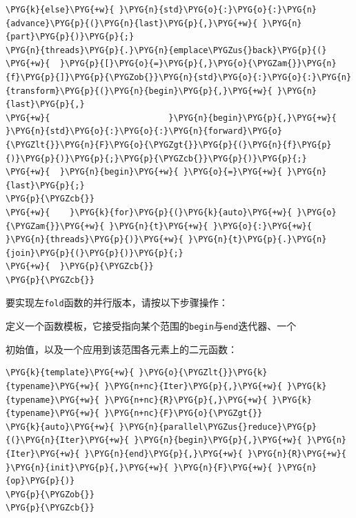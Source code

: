 \begin{codeblockbg}
\begin{Verbatim}[commandchars=\\\{\},breaklines=true,breakanywhere=true,fontsize=\codefont,xleftmargin=17bp]
\PYG{k}{else}\PYG{+w}{ }\PYG{n}{std}\PYG{o}{:}\PYG{o}{:}\PYG{n}{advance}\PYG{p}{(}\PYG{n}{last}\PYG{p}{,}\PYG{+w}{ }\PYG{n}{part}\PYG{p}{)}\PYG{p}{;}
\PYG{n}{threads}\PYG{p}{.}\PYG{n}{emplace\PYGZus{}back}\PYG{p}{(}
\PYG{+w}{  }\PYG{p}{[}\PYG{o}{=}\PYG{p}{,}\PYG{o}{\PYGZam{}}\PYG{n}{f}\PYG{p}{]}\PYG{p}{\PYGZob{}}\PYG{n}{std}\PYG{o}{:}\PYG{o}{:}\PYG{n}{transform}\PYG{p}{(}\PYG{n}{begin}\PYG{p}{,}\PYG{+w}{ }\PYG{n}{last}\PYG{p}{,}
\PYG{+w}{                        }\PYG{n}{begin}\PYG{p}{,}\PYG{+w}{ }\PYG{n}{std}\PYG{o}{:}\PYG{o}{:}\PYG{n}{forward}\PYG{o}{\PYGZlt{}}\PYG{n}{F}\PYG{o}{\PYGZgt{}}\PYG{p}{(}\PYG{n}{f}\PYG{p}{)}\PYG{p}{)}\PYG{p}{;}\PYG{p}{\PYGZcb{}}\PYG{p}{)}\PYG{p}{;}
\PYG{+w}{  }\PYG{n}{begin}\PYG{+w}{ }\PYG{o}{=}\PYG{+w}{ }\PYG{n}{last}\PYG{p}{;}
\PYG{p}{\PYGZcb{}}
\PYG{+w}{    }\PYG{k}{for}\PYG{p}{(}\PYG{k}{auto}\PYG{+w}{ }\PYG{o}{\PYGZam{}}\PYG{+w}{ }\PYG{n}{t}\PYG{+w}{ }\PYG{o}{:}\PYG{+w}{ }\PYG{n}{threads}\PYG{p}{)}\PYG{+w}{ }\PYG{n}{t}\PYG{p}{.}\PYG{n}{join}\PYG{p}{(}\PYG{p}{)}\PYG{p}{;}
\PYG{+w}{  }\PYG{p}{\PYGZcb{}}
\PYG{p}{\PYGZcb{}}
\end{Verbatim}
\end{codeblockbg}



要实现左\texttt{fold}函数的并行版本，请按以下步骤操作：



定义一个函数模板，它接受指向某个范围的\texttt{begin}与\texttt{end}迭代器、一个



初始值，以及一个应用到该范围各元素上的二元函数：


\begin{codeblockbg}
\begin{Verbatim}[commandchars=\\\{\},breaklines=true,breakanywhere=true,fontsize=\codefont,xleftmargin=17bp]
\PYG{k}{template}\PYG{+w}{ }\PYG{o}{\PYGZlt{}}\PYG{k}{typename}\PYG{+w}{ }\PYG{n+nc}{Iter}\PYG{p}{,}\PYG{+w}{ }\PYG{k}{typename}\PYG{+w}{ }\PYG{n+nc}{R}\PYG{p}{,}\PYG{+w}{ }\PYG{k}{typename}\PYG{+w}{ }\PYG{n+nc}{F}\PYG{o}{\PYGZgt{}}
\PYG{k}{auto}\PYG{+w}{ }\PYG{n}{parallel\PYGZus{}reduce}\PYG{p}{(}\PYG{n}{Iter}\PYG{+w}{ }\PYG{n}{begin}\PYG{p}{,}\PYG{+w}{ }\PYG{n}{Iter}\PYG{+w}{ }\PYG{n}{end}\PYG{p}{,}\PYG{+w}{ }\PYG{n}{R}\PYG{+w}{ }\PYG{n}{init}\PYG{p}{,}\PYG{+w}{ }\PYG{n}{F}\PYG{+w}{ }\PYG{n}{op}\PYG{p}{)}
\PYG{p}{\PYGZob{}}
\PYG{p}{\PYGZcb{}}
\end{Verbatim}
\end{codeblockbg}


